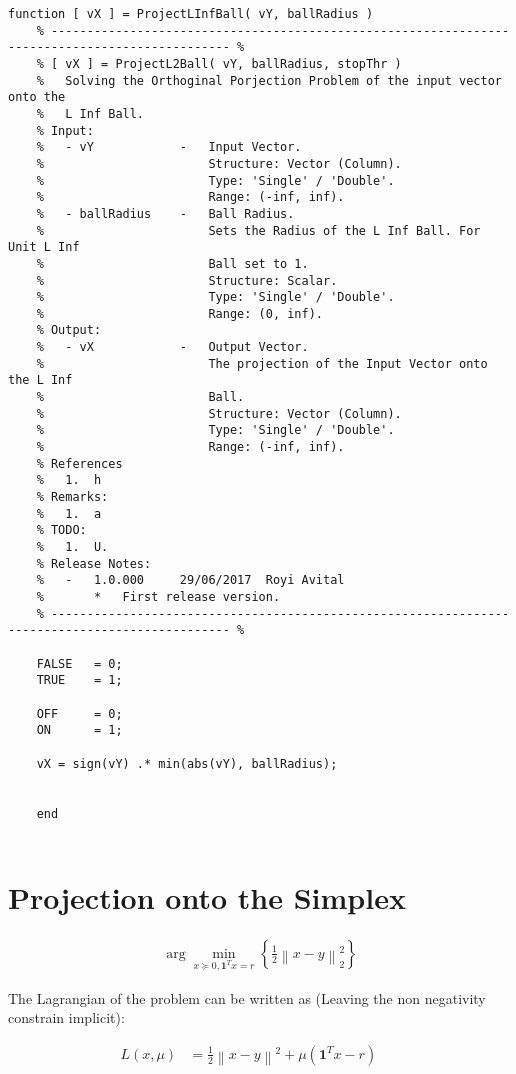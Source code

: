 \documentclass[]{article}
\newcommand{\MyBrace}[1]{\left\lbrace #1 \right\rbrace}
\newcommand{\MyNormSqr}[2]{{\left\| #1 \right\|}_{#2}^{2}}
\newcommand{\MyNormTwoSqr}[1]{\MyNormSqr{#1}{2}}
\begin{document}
	\begin{lstlisting}[caption={MATLAB Code - $ {L}_{\infty} $ Ball Projection}, label={lst:codeLInfProjection}]
	function [ vX ] = ProjectLInfBall( vY, ballRadius )
	% ----------------------------------------------------------------------------------------------- %
	% [ vX ] = ProjectL2Ball( vY, ballRadius, stopThr )
	%   Solving the Orthoginal Porjection Problem of the input vector onto the
	%   L Inf Ball.
	% Input:
	%   - vY            -   Input Vector.
	%                       Structure: Vector (Column).
	%                       Type: 'Single' / 'Double'.
	%                       Range: (-inf, inf).
	%   - ballRadius    -   Ball Radius.
	%                       Sets the Radius of the L Inf Ball. For Unit L Inf 
	%                       Ball set to 1.
	%                       Structure: Scalar.
	%                       Type: 'Single' / 'Double'.
	%                       Range: (0, inf).
	% Output:
	%   - vX            -   Output Vector.
	%                       The projection of the Input Vector onto the L Inf
	%                       Ball.
	%                       Structure: Vector (Column).
	%                       Type: 'Single' / 'Double'.
	%                       Range: (-inf, inf).
	% References
	%   1.  h
	% Remarks:
	%   1.  a
	% TODO:
	%   1.  U.
	% Release Notes:
	%   -   1.0.000     29/06/2017  Royi Avital
	%       *   First release version.
	% ----------------------------------------------------------------------------------------------- %
	
	FALSE   = 0;
	TRUE    = 1;
	
	OFF     = 0;
	ON      = 1;
	
	vX = sign(vY) .* min(abs(vY), ballRadius);
	
	
	end
	
	\end{lstlisting}
	
	\section{Projection onto the Simplex}
	
	\begin{align*}
	\arg \min_{ x \succeq 0, \boldsymbol{1}^{T} x = r } \MyBrace{ \frac{1}{2} \MyNormTwoSqr{ x - y } }
	\end{align*}
	
	The Lagrangian of the problem can be written as (Leaving the non negativity constrain implicit):
	
	
	\begin{align*}
	L \left( x, \mu \right) & = \frac{1}{2} {\left\| x - y \right\|}^{2} + \mu \left( \boldsymbol{1}^{T} x - r \right) && \text{} \\
	\end{align*}
	
\end{document}
